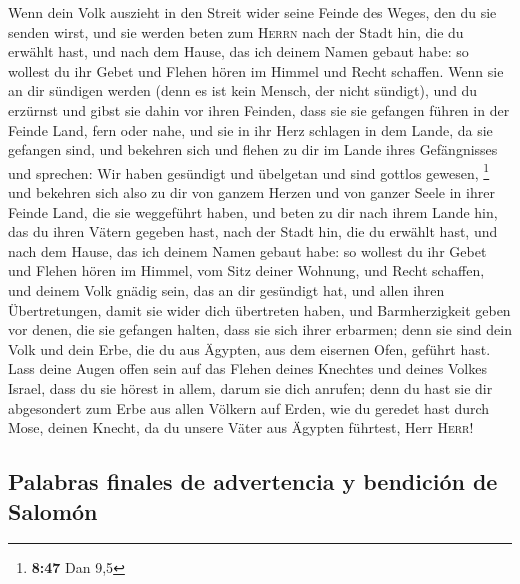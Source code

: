  Wenn dein Volk auszieht in den Streit wider seine Feinde
des Weges, den du sie senden wirst, und sie werden beten zum
\textsc{Herrn} nach der Stadt hin, die du erwählt hast, und nach dem
Hause, das ich deinem Namen gebaut habe:  so wollest du
ihr Gebet und Flehen hören im Himmel und Recht schaffen. 
Wenn sie an dir sündigen werden (denn es ist kein Mensch, der nicht
sündigt), und du erzürnst und gibst sie dahin vor ihren Feinden, dass
sie sie gefangen führen in der Feinde Land, fern oder nahe,
 und sie in ihr Herz schlagen in dem Lande, da sie
gefangen sind, und bekehren sich und flehen zu dir im Lande ihres
Gefängnisses und sprechen: Wir haben gesündigt und übelgetan und sind
gottlos gewesen, \footnote{\textbf{8:47} Dan 9,5}  und
bekehren sich also zu dir von ganzem Herzen und von ganzer Seele in
ihrer Feinde Land, die sie weggeführt haben, und beten zu dir nach ihrem
Lande hin, das du ihren Vätern gegeben hast, nach der Stadt hin, die du
erwählt hast, und nach dem Hause, das ich deinem Namen gebaut habe:
 so wollest du ihr Gebet und Flehen hören im Himmel, vom
Sitz deiner Wohnung, und Recht schaffen,  und deinem Volk
gnädig sein, das an dir gesündigt hat, und allen ihren Übertretungen,
damit sie wider dich übertreten haben, und Barmherzigkeit geben vor
denen, die sie gefangen halten, dass sie sich ihrer erbarmen;
 denn sie sind dein Volk und dein Erbe, die du aus
Ägypten, aus dem eisernen Ofen, geführt hast.  Lass deine
Augen offen sein auf das Flehen deines Knechtes und deines Volkes
Israel, dass du sie hörest in allem, darum sie dich anrufen;
 denn du hast sie dir abgesondert zum Erbe aus allen
Völkern auf Erden, wie du geredet hast durch Mose, deinen Knecht, da du
unsere Väter aus Ägypten führtest, Herr \textsc{Herr}!

\hypertarget{palabras-finales-de-advertencia-y-bendiciuxf3n-de-salomuxf3n}{%
\subsection{Palabras finales de advertencia y bendición de
Salomón}\label{palabras-finales-de-advertencia-y-bendiciuxf3n-de-salomuxf3n}}

